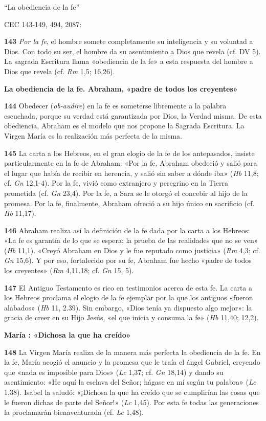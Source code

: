 \documentclass[]{article}
\begin{document}
``La obediencia de la fe''

CEC 143-149, 494, 2087:

\textbf{143} \emph{Por la fe}, el hombre somete completamente su
inteligencia y su voluntad a Dios. Con todo su ser, el hombre da su
asentimiento a Dios que revela (cf. DV 5). La sagrada Escritura llama
«obediencia de la fe» a esta respuesta del hombre a Dios que revela (cf.
\emph{Rm} 1,5; 16,26).

\textbf{La obediencia de la fe. Abraham, «padre de todos los creyentes»}

\textbf{144} Obedecer (\emph{ob-audire}) en la fe es someterse
libremente a la palabra escuchada, porque su verdad está garantizada por
Dios, la Verdad misma. De esta obediencia, Abraham es el modelo que nos
propone la Sagrada Escritura. La Virgen María es la realización más
perfecta de la misma.

\textbf{145} La carta a los Hebreos, en el gran elogio de la fe de los
antepasados, insiste particularmente en la fe de Abraham: «Por la fe,
Abraham obedeció y salió para el lugar que había de recibir en herencia,
y salió sin saber a dónde iba» (\emph{Hb} 11,8; cf. \emph{Gn} 12,1-4).
Por la fe, vivió como extranjero y peregrino en la Tierra prometida (cf.
\emph{Gn} 23,4). Por la fe, a Sara se le otorgó el concebir al hijo de
la promesa. Por la fe, finalmente, Abraham ofreció a su hijo único en
sacrificio (cf. \emph{Hb} 11,17).

\textbf{146} Abraham realiza así la definición de la fe dada por la
carta a los Hebreos: «La fe es garantía de lo que se espera; la prueba
de las realidades que no se ven» (\emph{Hb} 11,1). «Creyó Abraham en
Dios y le fue reputado como justicia» (\emph{Rm} 4,3; cf. \emph{Gn}
15,6). Y por eso, fortalecido por su fe, Abraham fue hecho «padre de
todos los creyentes» (\emph{Rm} 4,11.18; cf. \emph{Gn} 15, 5).

\textbf{147} El Antiguo Testamento es rico en testimonios acerca de esta
fe. La carta a los Hebreos proclama el elogio de la fe ejemplar por la
que los antiguos «fueron alabados» (\emph{Hb} 11, 2.39). Sin embargo,
«Dios tenía ya dispuesto algo mejor»: la gracia de creer en su Hijo
Jesús, «el que inicia y consuma la fe» (\emph{Hb} 11,40; 12,2).

\textbf{María : «Dichosa la que ha creído»}

\textbf{148} La Virgen María realiza de la manera más perfecta la
obediencia de la fe. En la fe, María acogió el anuncio y la promesa que
le traía el ángel Gabriel, creyendo que «nada es imposible para Dios»
(\emph{Lc} 1,37; cf. \emph{Gn} 18,14) y dando su asentimiento: «He aquí
la esclava del Señor; hágase en mí según tu palabra» (\emph{Lc} 1,38).
Isabel la saludó: «¡Dichosa la que ha creído que se cumplirían las cosas
que le fueron dichas de parte del Señor!» (\emph{Lc} 1,45). Por esta fe
todas las generaciones la proclamarán bienaventurada (cf. \emph{Lc}
1,48).
\end{document}
